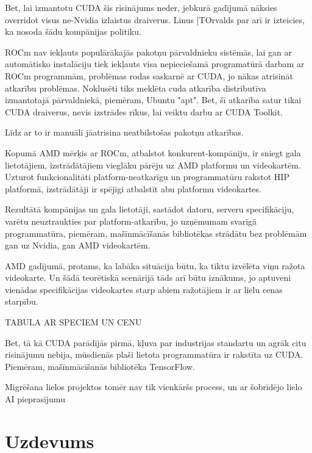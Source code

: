 \documentclass[12pt]{report}%
\theoremstyle{definition}
\begin{document}
Bet, lai izmantotu CUDA šis risinājums neder, jebkurā gadījumā nāksies overridot visus ne-Nvidia izlaistus draiverus. Linus |TOrvalds par arī ir izteicies, ka nosoda šādu kompānijas politiku.





ROCm nav iekļauts populārākajās pakotņu pārvaldnieku sistēmās, lai gan ar automātisko instalāciju 
tiek iekļauts visa nepieciešamā programatūrā darbam ar ROCm programmām, problēmas rodas saskarnē ar
CUDA, jo nākas atrisināt atkarību problēmas. Noklusēti tiks meklēta cuda atkarība distributīva izmantotajā
pārvaldniekā, piemēram, Ubuntu "apt". Bet, šī atkarība satur tikai CUDA draiverus, nevis 
izstrādes rīkus, lai veiktu darbu ar CUDA Toolkit. 

Līdz ar to ir manuāli jāatrisina neatbilstošas pakotņu atkarības.






Kopumā AMD mērķis ar ROCm, atbalstot konkurent-kompāniju, ir sniegt gala lietotājiem, izstrādātājiem
vieglāku pārēju uz AMD platformu un videokartēm. Uzturot funkcionalitāti platform-neatkarīgu un
programmatūru rakstot HIP platformā, izstrādātāji ir spējīgi atbalstīt abu platformu videokartes.

Rezultātā kompānijas un gala lietotāji, sastādot datoru, serveru specifikāciju, varētu neuztraukties
par platform-atkarību, jo uzņēmumam svarīgā programmatūra, piemēram, mašīnmācīšanās bibliotēkas
strādātu bez problēmām gan uz Nvidia, gan AMD videokartēm.

AMD gadījumā, protams, ka labāka situācija būtu, ka tiktu izvēlēta viņu ražota videokarte. Un šādā teorētiskā
scenārijā tāds arī būtu iznākums, jo aptuveni vienādas specifikācijas videokartes starp abiem ražotājiem
ir ar lielu cenas starpību.

TABULA AR SPECIEM UN CENU


Bet, tā kā CUDA parādījās pirmā, kļuva par industrijas standartu un agrāk citu risinājumu nebija, 
mūsdienās plaši lietota programmatūra ir rakstīta uz CUDA. Piemēram, mašīnmācīšanās bibliotēka TensorFlow. \cite{tensorflow_github}

Migrēšana lielos projektos tomēr nav tik vienkāršs process, un ar šobrīdējo lielo AI pieprasījumu 


\chapter{Uzdevums}
\end{document}
